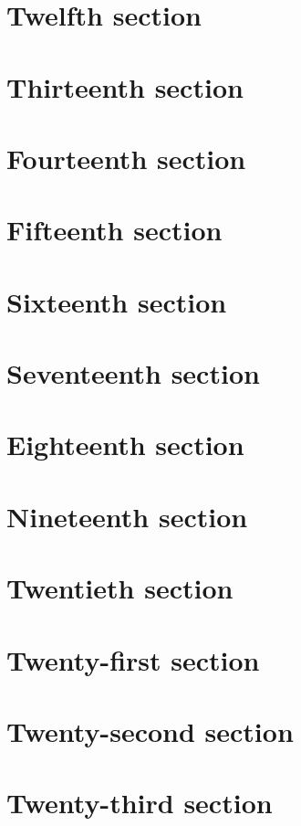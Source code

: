 \documentclass[oneside]{book}
\begin{document}
\begin{multicols}{2}
\section{Twelfth section}         
\section{Thirteenth section}      
\section{Fourteenth section}      
\section{Fifteenth section}       
\section{Sixteenth section}       
\section{Seventeenth section}     
\section{Eighteenth section}      
\section{Nineteenth section}      
\section{Twentieth section}       
\section{Twenty-first section}    
\section{Twenty-second section}   
\section{Twenty-third section}    

\end{multicols}
\end{document}
